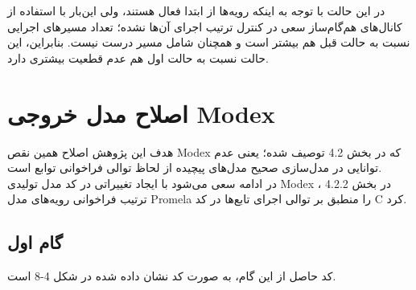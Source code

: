 
در این حالت با توجه به اینکه رویه‌ها از ابتدا فعال هستند، ولی این‌بار با استفاده از کانال‌های هم‌گام‌ساز سعی در کنترل ترتیب اجرای آن‌ها نشده؛ تعداد مسیرهای اجرایی نسبت به حالت قبل هم بیشتر است و همچنان شامل مسیر درست نیست. بنابراین، این حالت نسبت به حالت اول هم عدم قطعیت   بیشتری دارد.


\section{اصلاح مدل خروجی Modex}
هدف این پژوهش اصلاح همین نقص Modex که در بخش 4.2 توصیف شده؛ یعنی عدم توانایی در مدل‌سازی صحیح مدل‌های پیچیده از لحاظ توالی فراخوانی توابع است.
\\
در ادامه سعی می‌شود با ایجاد تغییراتی در کد مدل تولیدی Modex در بخش 4.2.2 ، ترتیب فراخوانی رویه‌های مدل  Promela را منطبق بر توالی اجرای تابع‌ها در کد C کرد.

\subsection{گام اول}
کد حاصل از این گام، به صورت کد نشان داده شده در شکل 4-8 است.


